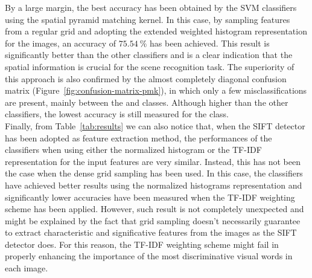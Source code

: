 \documentclass[../main.tex]{subfiles}
\begin{document}
By a large margin, the best accuracy has been obtained by the SVM classifiers using the spatial pyramid matching kernel. In this case, by sampling features from a regular grid and adopting the extended weighted histogram representation for the images, an accuracy of $\SI{75.54}{\percent}$ has been achieved. This result is significantly better than the other classifiers and is a clear indication that the spatial information is crucial for the scene recognition task. The superiority of this approach is also confirmed by the almost completely diagonal confusion matrix (Figure~\ref{fig:confusion-matrix-pmk}), in which only a few misclassifications are present, mainly between the  and  classes. Although higher than the other classifiers, the lowest accuracy is still measured for the  class.\\
Finally, from Table~\ref{tab:results} we can also notice that, when the SIFT detector has been adopted as feature extraction method, the performances of the classifiers when using either the normalized histogram or the TF-IDF representation for the input features are very similar. Instead, this has not been the case when the dense grid sampling has been used. In this case, the classifiers have achieved better results using the normalized histograms representation and significantly lower accuracies have been measured when the TF-IDF weighting scheme has been applied. However, such result is not completely unexpected and might be explained by the fact that grid sampling doesn't necessarily guarantee to extract characteristic and significative features from the images as the SIFT detector does. For this reason, the TF-IDF weighting scheme might fail in properly enhancing the importance of the most discriminative visual words in each image.\\
\end{document}
